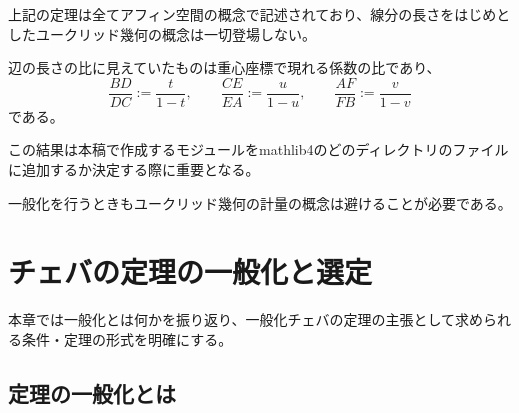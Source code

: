 \documentclass[a4paper,12pt]{bxjsbook}
\newlength{\customindent}
\newenvironment{body}{
  \par
  \begingroup
  \setlength{\leftskip}{\customindent}
  \setlength{\rightskip}{0pt}
  \setlength{\parindent}{1em}
  \setlength{\displayindent}{\customindent}
  \setlength{\displaywidth}{\dimexpr\linewidth-\customindent\relax}
}{
  \par
  \endgroup
}
\theoremstyle{theorem}
\begin{document}
    \begin{body}
        \indent 


        \indent 上記の定理は全てアフィン空間の概念で記述されており、線分の長さをはじめとしたユークリッド幾何の概念は一切登場しない。

        \indent 辺の長さの比に見えていたものは重心座標で現れる係数の比であり、
        \[
            \dfrac{BD}{DC} := \dfrac{t}{1-t},\qquad
            \dfrac{CE}{EA} := \dfrac{u}{1-u},\qquad
            \dfrac{AF}{FB} := \dfrac{v}{1-v}
        \]
        である。

        \indent この結果は本稿で作成するモジュールをmathlib4のどのディレクトリのファイルに追加するか決定する際に重要となる。

        \indent 一般化を行うときもユークリッド幾何の計量の概念は避けることが必要である。

    \end{body}

    \chapter{チェバの定理の一般化と選定}
    \begin{body}
        \indent 本章では一般化とは何かを振り返り、一般化チェバの定理の主張として求められる条件・定理の形式を明確にする。
    \end{body}

    \section{定理の一般化とは}
\end{document}
